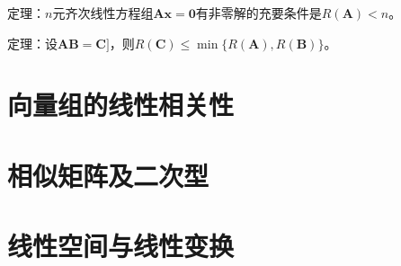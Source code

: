 \documentclass[12pt, a4paper, oneside]{ctexart}
\begin{document}
定理：$n$元齐次线性方程组$\mathbf{Ax}=\mathbf{0}$有非零解的充要条件是$R(\mathbf{A})<n$。

定理：设$\mathbf{AB}=\mathbf{C]}$，则$R(\mathbf{C})\leq \min\{R(\mathbf{A}),R(\mathbf{B})\}$。

\section{向量组的线性相关性}



\section{相似矩阵及二次型}

\section{线性空间与线性变换}
\end{document}
